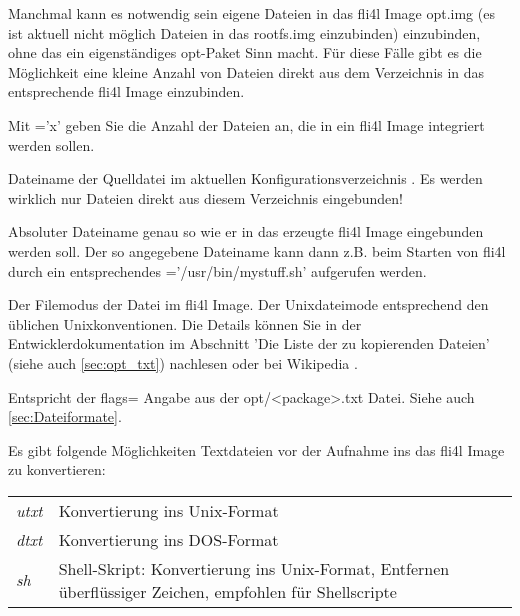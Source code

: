 \begin{description}
   Manchmal kann es notwendig sein eigene Dateien in das fli4l Image
   opt.img (es ist aktuell nicht möglich Dateien in das rootfs.img
   einzubinden) einzubinden, ohne das ein eigenständiges opt-Paket
   Sinn macht. Für diese Fälle gibt es die Möglichkeit eine kleine
   Anzahl von Dateien direkt aus dem
   Verzeichnis  in das entsprechende
   fli4l Image einzubinden.

   Mit ='x' geben Sie die Anzahl der Dateien an,
   die in ein fli4l Image integriert werden sollen.


    Dateiname der Quelldatei im aktuellen
    Konfigurationsverzeichnis . Es
    werden wirklich nur Dateien direkt aus diesem Verzeichnis
    eingebunden!


    Absoluter Dateiname genau so wie er in das erzeugte fli4l Image
    eingebunden werden soll. Der so angegebene Dateiname kann dann
    z.B. beim Starten von fli4l durch ein
    entsprechendes ='/usr/bin/mystuff.sh'
    aufgerufen werden.


    Der Filemodus der Datei im fli4l Image. Der Unixdateimode
    entsprechend den üblichen Unixkonventionen. Die Details können Sie
    in der Entwicklerdokumentation im Abschnitt 'Die Liste der zu
    kopierenden Dateien' (siehe auch \ref{sec:opt_txt})
    nachlesen oder bei
    Wikipedia .


    Entspricht der flags= Angabe aus der opt/<package>.txt
    Datei. Siehe auch \ref{sec:Dateiformate}.

    Es gibt folgende Möglichkeiten Textdateien vor der Aufnahme ins das fli4l Image zu konvertieren:
    \newline\newline
    \begin{tabular}{lp{6cm}}
        \emph{utxt} & Konvertierung ins Unix-Format\\
        \emph{dtxt} & Konvertierung ins DOS-Format\\
        \emph{sh}   & Shell-Skript: Konvertierung ins Unix-Format, Entfernen überflüssiger Zeichen,
        empfohlen für Shellscripte
    \end{tabular}

\end{description}

